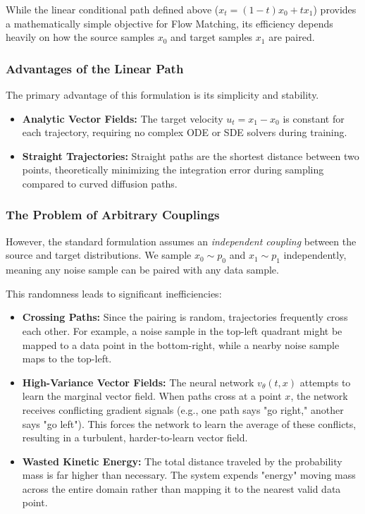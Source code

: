 \documentclass{book}
\begin{document}
While the linear conditional path defined above ($x_t = (1-t)x_0 + t x_1$) provides a mathematically simple objective for Flow Matching, its efficiency depends heavily on how the source samples $x_0$ and target samples $x_1$ are paired.

\subsubsection*{Advantages of the Linear Path}
The primary advantage of this formulation is its simplicity and stability.
\begin{itemize}
    \item \textbf{Analytic Vector Fields:} The target velocity $u_t = x_1 - x_0$ is constant for each trajectory, requiring no complex ODE or SDE solvers during training.
    \item \textbf{Straight Trajectories:} Straight paths are the shortest distance between two points, theoretically minimizing the integration error during sampling compared to curved diffusion paths.
\end{itemize}

\subsubsection*{The Problem of Arbitrary Couplings}
However, the standard formulation assumes an \textit{independent coupling} between the source and target distributions. We sample $x_0 \sim p_0$ and $x_1 \sim p_1$ independently, meaning any noise sample can be paired with any data sample.

This randomness leads to significant inefficiencies:
\begin{itemize}
    \item \textbf{Crossing Paths:} Since the pairing is random, trajectories frequently cross each other. For example, a noise sample in the top-left quadrant might be mapped to a data point in the bottom-right, while a nearby noise sample maps to the top-left.
    \item \textbf{High-Variance Vector Fields:} The neural network $v_\theta(t, x)$ attempts to learn the marginal vector field. When paths cross at a point $x$, the network receives conflicting gradient signals (e.g., one path says "go right," another says "go left"). This forces the network to learn the average of these conflicts, resulting in a turbulent, harder-to-learn vector field.
    \item \textbf{Wasted Kinetic Energy:} The total distance traveled by the probability mass is far higher than necessary. The system expends "energy" moving mass across the entire domain rather than mapping it to the nearest valid data point.
\end{itemize}
\end{document}
